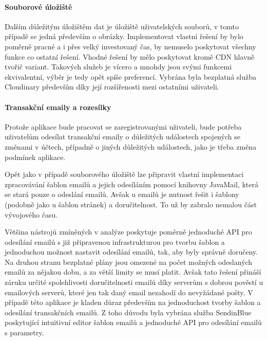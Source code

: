			\paragraph{Souborové úložiště}

			Dalším důležitým úložištěm dat je úložiště uživatelských souborů, v tomto případě se jedná především o obrázky.
			Implementovat vlastní řešení by bylo poměrně pracné a i přes velký investovaný čas, by nemuselo poskytovat všechny funkce
			co ostatní řešení.
			Vhodné řešení by mělo poskytovat kromě \ac{CDN} hlavně tvořič variant.
			Takových služeb je vícero a mnohdy jsou svými funkcemi ekvivalentní, výběr je tedy opět spíše preferencí.
			Vybrána byla bezplatná služba Cloudinary především díky její rozšířenosti mezi ostatními uživateli.

			\paragraph{Transakční emaily a rozesílky}

			Protože aplikace bude pracovat se zaregistrovanými uživateli, bude potřeba uživatelům odesílat transakční emaily
			o důležitých událostech spojených se změnami v účtech, případně o jiných důležitých událostech, jako je třeba změna podmínek
			aplikace.

			Opět jako v případě souborového úložiště lze připravit vlastní implementaci zpracovávání šablon emailů a jejich
			odesíláním pomocí knihovny JavaMail, která se stará pouze o odeslání emailů.
			Avšak u emailů je nutnost řešit i šablony (podobně jako u šablon stránek) a doručitelnost.
			To už by zabralo nemalou část vývojového času.

			Většina nástrojů zmíněných v analýze poskytuje poměrně jednoduché \ac{API} pro odesílání emailů
			s již připravenou infrastrukturou pro tvorbu šablon a jednoduchou možnost nastavit odesílání emailů, tak, aby
			byly správně doručeny.
			Na druhou stranu bezplatné plány jsou omezené na počet možných odeslaných emailů za nějakou dobu, a za větší limity
			se musí platit.
			Avšak tato řešení přináší záruku určité spolehlivosti doručitelnosti emailů díky serverům s dobrou pověstí
			u emailových serverů, které jen tak daný email nezahodí do nevyžádané pošty.
			V případě této aplikace je kladen důraz především na jednoduchost tvorby šablon a odesílání transakčních emailů.
			Z toho důvodu byla vybrána služba SendinBlue poskytující intuitivní editor šablon emailů a jednoduché \ac{API}
			pro odesílání emailů s parametry.

